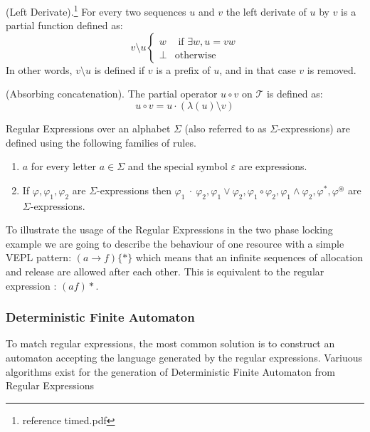 			\begin{dfn}
				(Left Derivate).\footnote{reference timed.pdf}
				For every two sequences $u$ and $v$ the left derivate of $u$ by $v$
				is a partial function defined as:
				\[ v \setminus u
					\begin{cases}
						w & \text{ if } \exists w,u = vw \\
						\perp & \text{otherwise}
					\end{cases}
				\]
				In other words, $v \setminus u$ is defined if $v$ is a prefix of $u$,
				and in that case $v$ is removed.
			\end{dfn}
			
			\begin{dfn}
				(Absorbing concatenation).
				The partial operator $u \circ v$ on $\mathcal{T}$ is defined as:
				\[ u \circ v = u \cdot (\lambda (u) \setminus v) \]
			\end{dfn}
			
			\begin{dfn}
				\label{dfn:cep:re}
				Regular Expressions over an alphabet $\Sigma$ (also referred to as $\Sigma$-expressions)
				are defined using the following families of rules.
				\begin{enumerate}
					\item \underline{$a$} for every letter $a \in \Sigma$ and the special symbol $\varepsilon$ are expressions.
					\item If $\varphi, \varphi_1, \varphi_2$ are $\Sigma$-expressions then %
						$ %
						\varphi_1~\cdot~\varphi_2,
						\varphi_1 \vee \varphi_2,
						\varphi_1 \circ \varphi_2,
						\varphi_1 \wedge \varphi_2,
						\varphi^\ast,
						\varphi^\circledast
						$ are $\Sigma$-expressions.
				\end{enumerate}
			\end{dfn}
			
			To illustrate the usage of the Regular Expressions in the two phase locking example we are going to describe the behaviour of one resource with a simple VEPL pattern:
			$(a \rightarrow f)\{\ast\}$ which means that an infinite sequences of allocation and release are allowed after each other. This is equivalent to the 
			regular expression : $(af)\ast$.

			\subsubsection{Deterministic Finite Automaton}
				To match regular expressions, the most common solution is to construct an automaton accepting the language generated by the regular expressions. Variuous algorithms
				exist for the generation of Deterministic Finite Automaton from Regular Expressions
				
